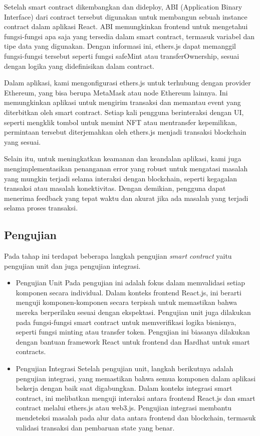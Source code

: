Setelah smart contract dikembangkan dan dideploy, ABI (Application Binary Interface) dari contract tersebut digunakan untuk membangun sebuah instance contract dalam aplikasi React. ABI memungkinkan frontend untuk mengetahui fungsi-fungsi apa saja yang tersedia dalam smart contract, termasuk variabel dan tipe data yang digunakan. Dengan informasi ini, ethers.js dapat memanggil fungsi-fungsi tersebut seperti fungsi safeMint atau transferOwnership, sesuai dengan logika yang didefinisikan dalam contract.

Dalam aplikasi, kami mengonfigurasi ethers.js untuk terhubung dengan provider Ethereum, yang bisa berupa MetaMask atau node Ethereum lainnya. Ini memungkinkan aplikasi untuk mengirim transaksi dan memantau event yang diterbitkan oleh smart contract. Setiap kali pengguna berinteraksi dengan UI, seperti mengklik tombol untuk memint NFT atau mentransfer kepemilikan, permintaan tersebut diterjemahkan oleh ethers.js menjadi transaksi blockchain yang sesuai.

Selain itu, untuk meningkatkan keamanan dan keandalan aplikasi, kami juga mengimplementasikan penanganan error yang robust untuk mengatasi masalah yang mungkin terjadi selama interaksi dengan blockchain, seperti kegagalan transaksi atau masalah konektivitas. Dengan demikian, pengguna dapat menerima feedback yang tepat waktu dan akurat jika ada masalah yang terjadi selama proses transaksi.

\subsection{Pengujian}
Pada tahap ini terdapat beberapa langkah pengujian \emph{smart contract} yaitu pengujian unit dan juga pengujian integrasi.

\begin{itemize}
    \item Pengujian Unit
    Pada pengujian ini adalah fokus dalam memvalidasi setiap komponen secara individual. Dalam konteks frontend React.js, ini berarti menguji komponen-komponen secara terpisah untuk memastikan bahwa mereka berperilaku sesuai dengan ekspektasi. Pengujian unit juga dilakukan pada fungsi-fungsi smart contract untuk memverifikasi logika bisnisnya, seperti fungsi minting atau transfer token. Pengujian ini biasanya dilakukan dengan bantuan framework React untuk frontend dan  Hardhat untuk smart contracts.

    \item Pengujian Integrasi
    Setelah pengujian unit, langkah berikutnya adalah pengujian integrasi, yang memastikan bahwa semua komponen dalam aplikasi bekerja dengan baik saat digabungkan. Dalam konteks integrasi smart contract, ini melibatkan menguji interaksi antara frontend React.js dan smart contract melalui ethers.js atau web3.js. Pengujian integrasi membantu mendeteksi masalah pada alur data antara frontend dan blockchain, termasuk validasi transaksi dan pembaruan state yang benar.
\end{itemize}

